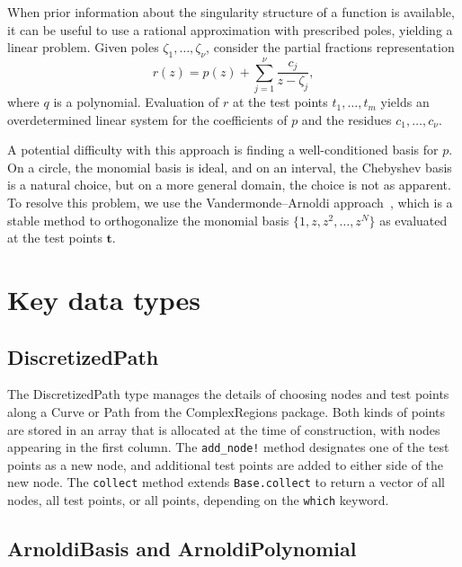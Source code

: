 \documentclass{juliacon}
\begin{document}
When prior information about the singularity structure of a function is available, it can be useful to use a rational approximation with prescribed poles, yielding a linear problem. Given poles $\zeta_1,\ldots,\zeta_\nu$, consider the partial fractions representation
\begin{equation}
    \label{eq:parfrac}
    r(z) = p(z) + \sum_{j=1}^\nu \frac{c_j}{z - \zeta_j},
\end{equation}
where $q$ is a polynomial. Evaluation of $r$ at the test points $t_1,\ldots,t_m$ yields an overdetermined linear system for the coefficients of $p$ and the residues $c_1,\ldots,c_\nu$.

A potential difficulty with this approach is finding a well-conditioned basis for $p$. On a circle, the monomial basis is ideal, and on an interval, the Chebyshev basis is a natural choice, but on a more general domain, the choice is not as apparent. To resolve this problem, we use the Vandermonde–Arnoldi approach~\cite{BrubeckVandermondeArnoldi2021}, which is a stable method to orthogonalize the monomial basis $\{1,z,z^2,\ldots,z^{N}\}$ as evaluated at the test points $\bm{t}$.

\section{Key data types}
\label{sec:types}

\subsection{DiscretizedPath}

The \textsf{DiscretizedPath} type manages the details of choosing nodes and test points along a \textsf{Curve} or \textsf{Path} from the \textsf{ComplexRegions} package. Both kinds of points are stored in an array that is allocated at the time of construction, with nodes appearing in the first column. The \verb|add_node!| method designates one of the test points as a new node, and additional test points are added to either side of the new node. The \verb|collect| method extends \verb|Base.collect| to return a vector of all nodes, all test points, or all points, depending on the \verb|which| keyword.

\subsection{ArnoldiBasis and ArnoldiPolynomial}
\end{document}
